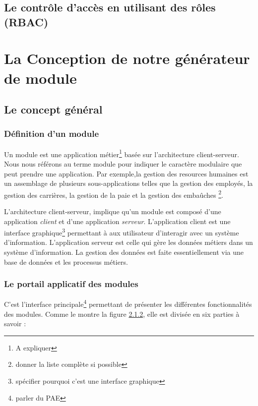 \documentclass[a4paper,11pt]{report}
\begin{document}
\section{Le contrôle d'accès en utilisant des rôles (RBAC)}

\chapter{La Conception de notre générateur de module}
\section{Le concept général}
\subsection{Définition d'un module}

Un module est une application métier\footnote{A expliquer} basée sur
l'architecture client-serveur. Nous nous référons au terme module pour
indiquer le caractère modulaire que peut prendre une application. Par
exemple,la gestion des resources humaines est un assemblage de
plusieurs sous-applications telles que la gestion des employés, la
gestion des carrières, la gestion de la paie et la gestion des
embaûches \footnote{donner la liste complète si possible}. 

L'architecture client-serveur, implique qu'un module est composé
d'une application {\em client} et d'une application {\em serveur}.
L'application client est une interface graphique\footnote{spécifier
  pourquoi c'est une interface graphique } permettant à
aux utilisateur d'interagir avec un système d'information.
L'application serveur est celle qui gère les données métiers dans un
système d'information.
La gestion des données est faite essentiellement via une base de
données et les processus métiers. 

\subsection{Le portail applicatif des modules}
C'est l'interface principale\footnote{parler du PAE} permettant 
de présenter les différentes fonctionnalités des modules. Comme
le montre la figure \ref{}, elle est divisée en six parties à savoir :
\end{document}
